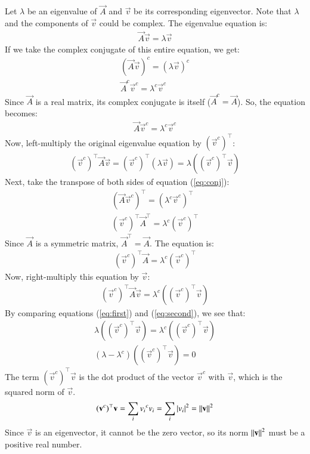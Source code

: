 \documentclass[journal]{IEEEtran}
\newcommand{\conj}[1]{{#1}^c}
\begin{document}
	Let $\lambda$ be an eigenvalue of $\vec{A}$ and $\vec{v}$ be its corresponding eigenvector. Note that $\lambda$ and the components of $\vec{v}$ could be complex. The eigenvalue equation is:
	\begin{align}
		\vec{A}\vec{v} = \lambda\vec{v}
	\end{align}
	If we take the complex conjugate of this entire equation, we get:
	\begin{align}
		(\vec{A}\vec{v})^c = (\lambda\vec{v})^c \\
		\conj{\vec{A}}\conj{\vec{v}} = \conj{\lambda}\conj{\vec{v}}
	\end{align}
	Since $\vec{A}$ is a real matrix, its complex conjugate is itself ($\conj{\vec{A}} = \vec{A}$). So, the equation becomes:
	\begin{align}
		\vec{A}\conj{\vec{v}} = \conj{\lambda}\conj{\vec{v}} \label{eq:conj}
	\end{align}
	Now, left-multiply the original eigenvalue equation by $(\conj{\vec{v}})^\top$:
	\begin{align}
		(\conj{\vec{v}})^\top\vec{A}\vec{v} = (\conj{\vec{v}})^\top(\lambda\vec{v}) = \lambda((\conj{\vec{v}})^\top\vec{v}) \label{eq:first}
	\end{align}
	Next, take the transpose of both sides of equation (\ref{eq:conj}):
	\begin{align}
		(\vec{A}\conj{\vec{v}})^\top = (\conj{\lambda}\conj{\vec{v}})^\top \\
		(\conj{\vec{v}})^\top\vec{A}^\top = \conj{\lambda}(\conj{\vec{v}})^\top
	\end{align}
	Since $\vec{A}$ is a symmetric matrix, $\vec{A}^\top = \vec{A}$. The equation is:
	\begin{align}
		(\conj{\vec{v}})^\top\vec{A} = \conj{\lambda}(\conj{\vec{v}})^\top
	\end{align}
	Now, right-multiply this equation by $\vec{v}$:
	\begin{align}
		(\conj{\vec{v}})^\top\vec{A}\vec{v} = \conj{\lambda}((\conj{\vec{v}})^\top\vec{v}) \label{eq:second}
	\end{align}
	By comparing equations (\ref{eq:first}) and (\ref{eq:second}), we see that:
	\begin{align}
		\lambda((\conj{\vec{v}})^\top\vec{v}) = \conj{\lambda}((\conj{\vec{v}})^\top\vec{v}) \\
		(\lambda - \conj{\lambda})((\conj{\vec{v}})^\top\vec{v}) = 0
	\end{align}
	The term $(\conj{\vec{v}})^\top\vec{v}$ is the dot product of the vector $\conj{\vec{v}}$ with $\vec{v}$, which is the squared norm of $\vec{v}$.
	\begin{align}
		(\conj{\vec{v}})^\top\vec{v} = \sum_{i} \conj{v_i}v_i = \sum_{i} |v_i|^2 = \norm{\vec{v}}^2
	\end{align}
	Since $\vec{v}$ is an eigenvector, it cannot be the zero vector, so its norm $\left\lVert\mathbf{v}\right\rVert^2$ must be a positive real number.
	
\end{document}
